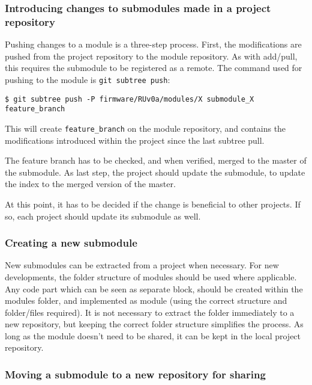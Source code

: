 \documentclass{scrartcl}
\begin{document}
\subsubsection{Introducing changes to submodules made in a project
  repository}

Pushing changes to a module is a three-step process. First, the
modifications are pushed from the project repository to the module
repository. As with add/pull, this requires the submodule to be
registered as a remote. The command used for pushing to the module is
\verb|git subtree push|:

\begin{verbatim}
$ git subtree push -P firmware/RUv0a/modules/X submodule_X feature_branch
\end{verbatim}

This will create \verb|feature_branch| on the module repository, and
contains the modifications introduced within the project since the
last subtree pull.

The feature branch has to be checked, and when verified, merged to the
master of the submodule. As last step, the project should update the
submodule, to update the index to the merged version of the master.

At this point, it has to be decided if the change is beneficial to
other projects. If so, each project should update its submodule as
well.

\subsubsection{Creating a new submodule}

New submodules can be extracted from a project when necessary. For new
developments, the folder structure of modules should be used where
applicable. Any code part which can be seen as separate block, should
be created within the modules folder, and implemented as module (using
the correct structure and folder/files required). It is not necessary
to extract the folder immediately to a new repository, but keeping the
correct folder structure simplifies the process. As long as the module
doesn't need to be shared, it can be kept in the local project
repository.

\subsubsection{Moving a submodule to a new repository for sharing}
\end{document}
